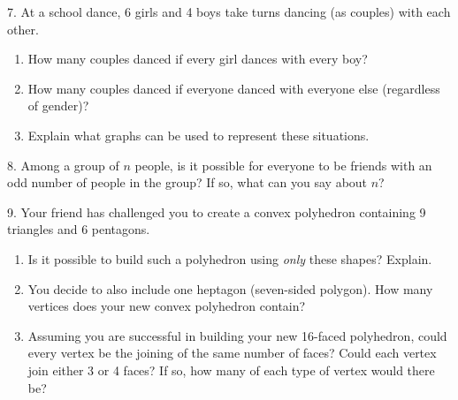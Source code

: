 \documentclass[10pt,]{book}
\theoremstyle{plain}
\theoremstyle{definition}
\numberwithin{equation}{chapter}
\begin{document}
\begin{exerciselist}
\par\smallskip
\item[7.]\hypertarget{exercise-326}{}
            At a school dance, 6 girls and 4 boys take turns dancing (as couples) with each other.
          \leavevmode%
\begin{enumerate}[label=(\alph*)]
\item\hypertarget{li-828}{}
                How many couples danced if every girl dances with every boy?
\item\hypertarget{li-829}{}
                How many couples danced if everyone danced with everyone else (regardless of gender)?
\item\hypertarget{li-830}{}
                Explain what graphs can be used to represent these situations.
\end{enumerate}

\par\smallskip
\item[8.]\hypertarget{exercise-327}{}
            Among a group of \(n\) people, is it possible for everyone to be friends with an odd number of people in the group? If so, what can you say about \(n\)?
\par\smallskip
\item[9.]\hypertarget{exercise-328}{}
            Your friend has challenged you to create a convex polyhedron containing 9 triangles and 6 pentagons.
          \leavevmode%
\begin{enumerate}[label=(\alph*)]
\item\hypertarget{li-834}{}
                Is it possible to build such a polyhedron using \emph{only} these shapes? Explain.
\item\hypertarget{li-835}{}
                You decide to also include one heptagon (seven-sided polygon). How many vertices does your new convex polyhedron contain?
\item\hypertarget{li-836}{}
                Assuming you are successful in building your new 16-faced polyhedron, could every vertex be the joining of the same number of faces? Could each vertex join either 3 or 4 faces? If so, how many of each type of vertex would there be?
\end{enumerate}


\end{exerciselist}
\end{document}
